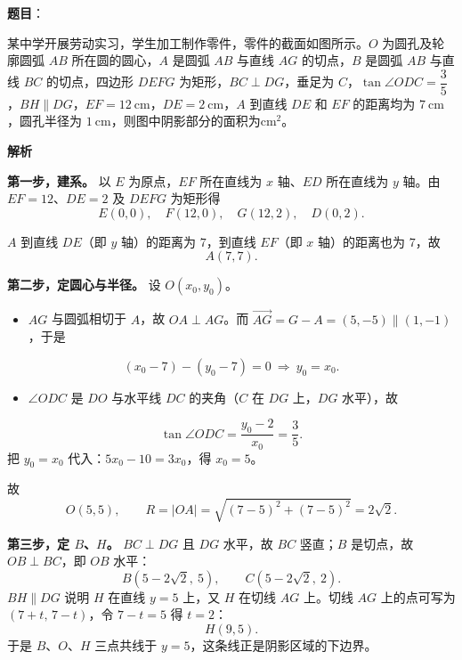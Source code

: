 \begin{answer}

\textbf{题目}：

某中学开展劳动实习，学生加工制作零件，零件的截面如图所示。$O$ 为圆孔及轮廓圆弧 $AB$ 所在圆的圆心，$A$ 是圆弧 $AB$ 与直线 $AG$ 的切点，$B$ 是圆弧 $AB$ 与直线 $BC$ 的切点，四边形 $DEFG$ 为矩形，$BC\perp DG$，垂足为 $C$，$\tan\angle ODC=\dfrac35$，$BH\parallel DG$，$EF=12\ \mathrm{cm}$，$DE=2\ \mathrm{cm}$，$A$ 到直线 $DE$ 和 $EF$ 的距离均为 $7\ \mathrm{cm}$，圆孔半径为 $1\ \mathrm{cm}$，则图中阴影部分的面积为\gkblank{}$\mathrm{cm}^2$。
\nopagebreak[4]
\begin{center}\end{center}
\nopagebreak[4]
\textbf{解析}

\textbf{第一步，建系。} 以 $E$ 为原点，$EF$ 所在直线为 $x$ 轴、$ED$ 所在直线为 $y$ 轴。由 $EF=12$、$DE=2$ 及 $DEFG$ 为矩形得
\nopagebreak[4]
\[E(0,0),\quad F(12,0),\quad G(12,2),\quad D(0,2).\]

$A$ 到直线 $DE$（即 $y$ 轴）的距离为 $7$，到直线 $EF$（即 $x$ 轴）的距离也为 $7$，故
\nopagebreak[4]
\[A(7,7).\]

\textbf{第二步，定圆心与半径。} 设 $O(x_0,y_0)$。

\begin{itemize}
\item $AG$ 与圆弧相切于 $A$，故 $OA\perp AG$。而 $\overrightarrow{AG}=G-A=(5,-5)\parallel(1,-1)$，于是
\end{itemize}
\nopagebreak[4]
\[(x_0-7)-(y_0-7)=0\ \Longrightarrow\ y_0=x_0 .\]
\begin{itemize}
\item $\angle ODC$ 是 $DO$ 与水平线 $DC$ 的夹角（$C$ 在 $DG$ 上，$DG$ 水平），故
\end{itemize}
\nopagebreak[4]
\[\tan\angle ODC=\frac{y_0-2}{x_0}=\frac35 .\]
把 $y_0=x_0$ 代入：$5x_0-10=3x_0$，得 $x_0=5$。

故
\nopagebreak[4]
\[O(5,5),\qquad R=|OA|=\sqrt{(7-5)^2+(7-5)^2}=2\sqrt2 .\]

\textbf{第三步，定 $B$、$H$。} $BC\perp DG$ 且 $DG$ 水平，故 $BC$ 竖直；$B$ 是切点，故 $OB\perp BC$，即 $OB$ 水平：
\nopagebreak[4]
\[B\left(5-2\sqrt2,\ 5\right),\qquad C\left(5-2\sqrt2,\ 2\right).\]
$BH\parallel DG$ 说明 $H$ 在直线 $y=5$ 上，又 $H$ 在切线 $AG$ 上。切线 $AG$ 上的点可写为 $(7+t,\,7-t)$，令 $7-t=5$ 得 $t=2$：
\nopagebreak[4]
\[H(9,5).\]
于是 $B$、$O$、$H$ 三点共线于 $y=5$，这条线正是阴影区域的下边界。


\end{answer}
